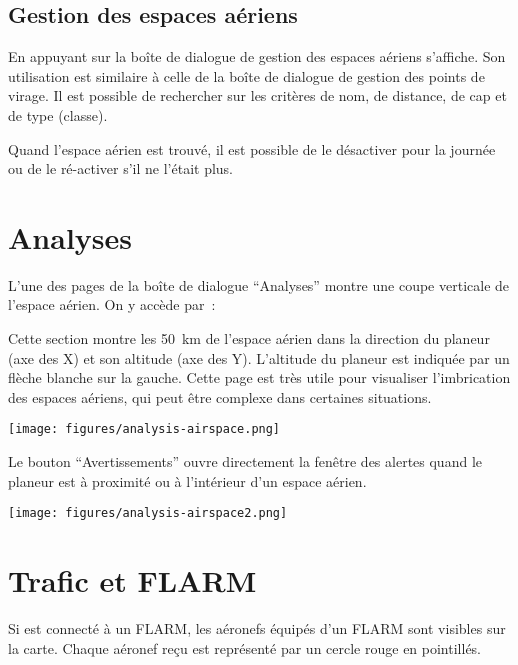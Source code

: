 \subsection*{Gestion des espaces aériens}

En appuyant sur 
la boîte de dialogue de gestion des espaces aériens s'affiche. Son utilisation est similaire à celle de la boîte de dialogue de gestion des points de virage. Il est possible de rechercher sur les critères de nom, de distance, de cap et de type (classe).

Quand l'espace aérien est trouvé, il est possible de le désactiver pour la journée ou de le ré-activer s'il ne l'était plus.


\section{Analyses}

L'une des pages de la boîte de dialogue ``Analyses'' montre une coupe verticale de l'espace aérien. On y accède par~:

Cette section montre les 50~km de l'espace aérien dans la direction du planeur (axe des X) et son altitude (axe des Y). L'altitude du planeur est indiquée par un flèche blanche sur la gauche. Cette page est très utile pour visualiser l'imbrication des espaces aériens, qui peut être complexe dans certaines situations.

\begin{center}
\texttt{[image: figures/analysis-airspace.png]}
\end{center}

Le bouton ``Avertissements''
ouvre directement la fenêtre des alertes quand le planeur est à proximité ou à l'intérieur d'un espace aérien.
\begin{center}
\texttt{[image: figures/analysis-airspace2.png]}
\end{center}


\section{Trafic et FLARM}

Si \xc{} est connecté à un FLARM, les aéronefs équipés d'un FLARM sont visibles sur la carte. Chaque aéronef reçu est représenté par un cercle rouge en pointillés.


